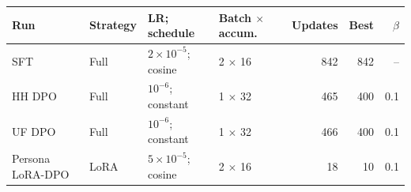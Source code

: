 \small
\begin{tabular}{llllrrr}
\toprule
Run & Strategy & LR; schedule & Batch $\times$ accum. & Updates & Best & $\beta$ \\
\midrule
SFT & Full & $2\times10^{-5}$; cosine & 2 $\times$ 16 & 842 & 842 & -- \\
HH DPO & Full & $10^{-6}$; constant & 1 $\times$ 32 & 465 & 400 & 0.1 \\
UF DPO & Full & $10^{-6}$; constant & 1 $\times$ 32 & 466 & 400 & 0.1 \\
Persona LoRA-DPO & LoRA & $5\times10^{-5}$; cosine & 2 $\times$ 16 & 18 & 10 & 0.1 \\
\bottomrule
\end{tabular}
